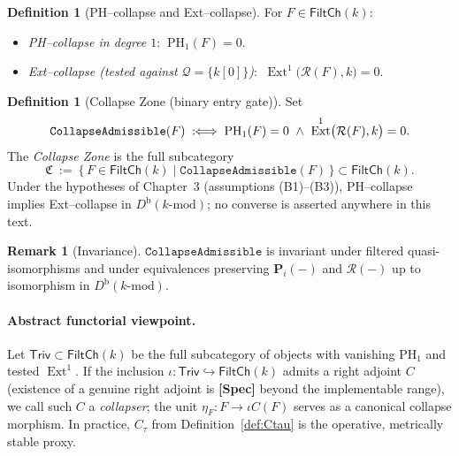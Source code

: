 \documentclass[11pt]{article}
\DeclareMathOperator{\Ext}{Ext}
\numberwithin{equation}{section}
\theoremstyle{definition}
\newtheorem{definition}[theorem]{Definition}
\newtheorem{remark}[theorem]{Remark}
\providecommand{\n}{\unskip\space}
\begin{document}
\begin{definition}[PH--collapse and Ext--collapse]
For $F\in\mathsf{FiltCh}(k)$:
\begin{itemize}
  \item \emph{PH--collapse in degree $1$}: $\ \mathrm{PH}_1(F)=0$.
  \item \emph{Ext--collapse (tested against $\mathcal{Q}=\{k[0]\}$)}: $\ \Ext^1\!\big(\mathcal{R}(F),k\big)=0$.
\end{itemize}
\end{definition}

\begin{definition}[Collapse Zone (binary entry gate)]
Set
\[
\texttt{CollapseAdmissible}(F)\;:\!\!\iff\;\n\mathrm{PH}_1(F)=0\ \wedge\ \Ext^1\!\big(\mathcal{R}(F),k\big)=0.
\]
The \emph{Collapse Zone} is the full subcategory
\[
\mathfrak{C}\ :=\ \{\,F\in\mathsf{FiltCh}(k)\mid \texttt{CollapseAdmissible}(F)\,\}\subset \mathsf{FiltCh}(k).
\]
Under the hypotheses of Chapter~3 (assumptions (B1)–(B3)), PH--collapse implies Ext--collapse in $D^{\mathrm{b}}(k\text{-mod})$; no converse is asserted anywhere in this text.
\end{definition}

\begin{remark}[Invariance]
$\texttt{CollapseAdmissible}$ is invariant under filtered quasi-isomorphisms and under equivalences preserving $\mathbf{P}_i(-)$ and $\mathcal{R}(-)$ up to isomorphism in $D^{\mathrm{b}}(k\text{-mod})$.
\end{remark}

\paragraph{Abstract functorial viewpoint.}
Let $\mathsf{Triv}\subset\mathsf{FiltCh}(k)$ be the full subcategory of objects with vanishing $\mathrm{PH}_1$ and tested $\Ext^1$. If the inclusion $\iota:\mathsf{Triv}\hookrightarrow\mathsf{FiltCh}(k)$ admits a right adjoint $C$ (existence of a genuine right adjoint is \textbf{[Spec]} beyond the implementable range), we call such $C$ a \emph{collapser}; the unit $\eta_F:F\to \iota C(F)$ serves as a canonical collapse morphism. In practice, $C_\tau$ from Definition~\ref{def:Ctau} is the operative, metrically stable proxy.
\end{document}
